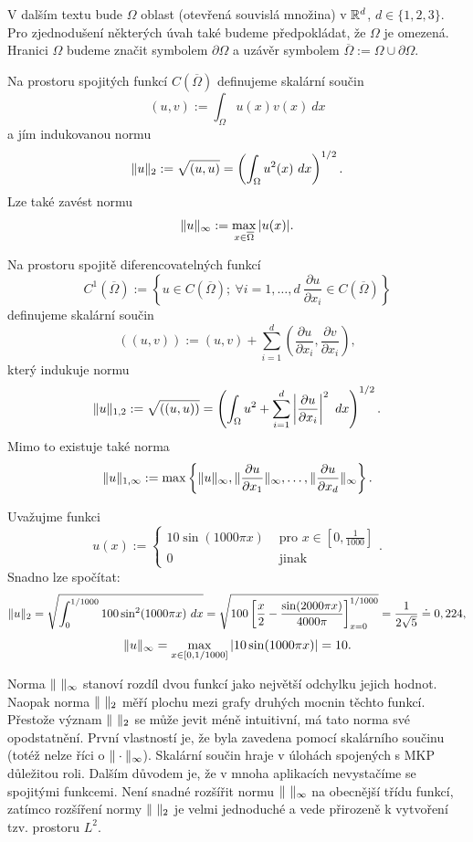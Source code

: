 V dalším textu bude $\Omega$ oblast (otevřená souvislá množina) v $\mathbb R^d$, $d\in\{1,2,3\}$.
Pro zjednodušení některých úvah také budeme předpokládat, že $\Omega$ je omezená.
Hranici $\Omega$ budeme značit symbolem $\partial\Omega$ a uzávěr symbolem $\overline\Omega:=\Omega\cup\partial\Omega$.

\begin{ex}
Na prostoru spojitých funkcí $C(\overline\Omega)$ definujeme skalární součin
\[ (u,v):=\int_\Omega u(x) v(x)~dx \]
a jím indukovanou normu
\[ \|u\|_2 := \sqrt{(u,u)} = \left(\int_\Omega u^2(x)~dx\right)^{1/2}. \]
Lze také zavést normu
\[ \|u\|_\infty := \max_{x\in\overline\Omega}|u(x)|. \]
\end{ex}

\begin{ex}
Na prostoru spojitě diferencovatelných funkcí
\[ C^1(\overline\Omega):=\left\{u\in C(\overline\Omega);~\forall i=1,\ldots,d~\frac{\partial u}{\partial x_i}\in C(\overline\Omega)\right\} \]
definujeme skalární součin
\[ ((u,v)) := (u,v) + \sum_{i=1}^d(\frac{\partial u}{\partial x_i},\frac{\partial v}{\partial x_i}), \]
který indukuje normu
\[ \|u\|_{1,2} := \sqrt{((u,u))} = \left(\int_\Omega u^2 + \sum_{i=1}^d\left|\frac{\partial u}{\partial x_i}\right|^2~dx\right)^{1/2}. \]
Mimo to existuje také norma
\[ \|u\|_{1,\infty} := \max\left\{\|u\|_{\infty},\|\frac{\partial u}{\partial x_1}\|_{\infty},\dots,\|\frac{\partial u}{\partial x_d}\|_\infty\right\}. \]
\end{ex}

\begin{ex}
Uvažujme funkci
\[ u(x):=\begin{cases}10\sin(1000\pi x) & \mbox{ pro }x\in[0,\frac1{1000}]\\0 & \mbox{ jinak}\end{cases}. \]
Snadno lze spočítat:
\[
\|u\|_2 = \sqrt{\int_0^{1/1000}100\sin^2(1000\pi x)~dx}
= \sqrt{100\left[\frac{x}2-\frac{\sin(2000\pi x)}{4000\pi}\right]_{x=0}^{1/1000}}
= \frac1{2\sqrt{5}}\doteq 0,224,
\]
\[ \|u\|_\infty = \max_{x\in[0,1/1000]}|10\sin(1000\pi x)| = 10. \]
\end{ex}

Norma $\|\ \|_\infty$ stanoví rozdíl dvou funkcí jako největší odchylku jejich hodnot.
Naopak norma $\norm{\ }_2$ měří plochu mezi grafy druhých mocnin těchto funkcí.
Přestože význam $\norm{\ }_2$ se může jevit méně intuitivní, má tato norma své opodstatnění. První vlastností je, že byla zavedena pomocí skalárního součinu (totéž nelze říci o $\|\cdot\|_\infty$). Skalární součin hraje v úlohách spojených s MKP důležitou roli. 
Dalším důvodem je, že v mnoha aplikacích nevystačíme se spojitými funkcemi. Není snadné rozšířit normu $\|\ \|_\infty$ na obecnější třídu funkcí, zatímco rozšíření normy $\norm{\ }_2$ je velmi jednoduché a vede přirozeně k vytvoření tzv. prostoru $L^2$.





